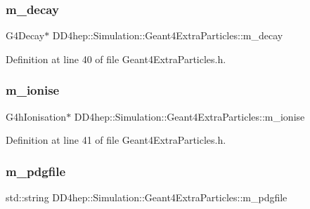 \subsubsection{\texorpdfstring{m\+\_\+decay}{m\_decay}}
{\footnotesize\ttfamily G4\+Decay$\ast$ D\+D4hep\+::\+Simulation\+::\+Geant4\+Extra\+Particles\+::m\+\_\+decay\hspace{0.3cm}{\ttfamily [private]}}



Definition at line 40 of file Geant4\+Extra\+Particles.\+h.

\hypertarget{class_d_d4hep_1_1_simulation_1_1_geant4_extra_particles_a3a1a935a2a36d8e61af6c632fa7b847b}{}\label{class_d_d4hep_1_1_simulation_1_1_geant4_extra_particles_a3a1a935a2a36d8e61af6c632fa7b847b} 
\subsubsection{\texorpdfstring{m\+\_\+ionise}{m\_ionise}}
{\footnotesize\ttfamily G4h\+Ionisation$\ast$ D\+D4hep\+::\+Simulation\+::\+Geant4\+Extra\+Particles\+::m\+\_\+ionise\hspace{0.3cm}{\ttfamily [private]}}



Definition at line 41 of file Geant4\+Extra\+Particles.\+h.

\hypertarget{class_d_d4hep_1_1_simulation_1_1_geant4_extra_particles_ac50ed0b5305835df3be2537c93483d6b}{}\label{class_d_d4hep_1_1_simulation_1_1_geant4_extra_particles_ac50ed0b5305835df3be2537c93483d6b} 
\subsubsection{\texorpdfstring{m\+\_\+pdgfile}{m\_pdgfile}}
{\footnotesize\ttfamily std\+::string D\+D4hep\+::\+Simulation\+::\+Geant4\+Extra\+Particles\+::m\+\_\+pdgfile\hspace{0.3cm}{\ttfamily [private]}}



